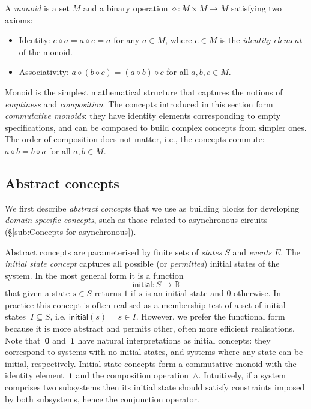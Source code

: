 \documentclass[british,compsoc]{IEEEtran}
\begin{document}
A \emph{monoid} is a set $M$ and a binary operation $\diamond : M\times M\rightarrow M$
satisfying two axioms:
\begin{itemize}
\item Identity: $e\diamond a=a\diamond e=a$ for any $a\in M$, where $e\in M$
is the \emph{identity element} of the monoid.
\item Associativity: $a\diamond(b\diamond c)=(a\diamond b)\diamond c$ for
all $a,b,c\in M$.
\end{itemize}
Monoid is the simplest mathematical structure that captures the notions
of \emph{emptiness} and \emph{composition}. The concepts introduced
in this section form \emph{commutative monoids}: they have identity
elements corresponding to empty specifications, and can be composed
to build complex concepts from simpler ones. The order of composition
does not matter, i.e., the concepts commute: $a\diamond b=b\diamond a$
for all $a,b\in M$.

\vspace{-1mm}
\subsection{Abstract concepts}

We first describe \emph{abstract concepts} that we use as building
blocks for developing \emph{domain specific concepts}, such as those
related to asynchronous circuits (\S\ref{sub:Concepts-for-asynchronous}).

Abstract concepts are parameterised by finite sets of \emph{states}
$S$ and \emph{events} $E$. The \emph{initial state concept} captures
all possible (or \emph{permitted}) initial states of the system. In
the most general form it is a function
\[
\mathsf{initial}:S\rightarrow\mathbb{B}
\]
that given a state $s\in S$ returns $1$ if $s$ is an initial state
and $0$ otherwise. In practice this concept is often realised as
a membership test of a set of initial states~$I\subseteq S$, i.e.
$\mathsf{initial}(s)=s\in I$. However, we prefer the functional form
because it is more abstract and permits other, often more efficient
realisations. Note that~$\mathbf{0}$ and~$\mathbf{1}$ have natural
interpretations as initial concepts: they correspond to systems with
no initial states, and systems where any state can be initial, respectively.
Initial state concepts form a commutative monoid with the identity
element~$\mathbf{1}$ and the composition operation~$\wedge$. Intuitively,
if a system comprises two subsystems then its initial state should
satisfy constraints imposed by both subsystems, hence the conjunction
operator.
\end{document}
